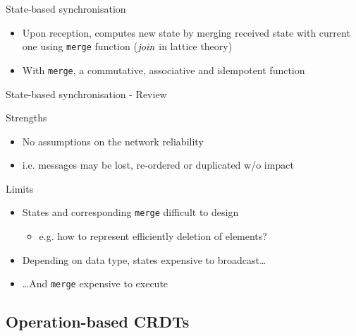 \begin{frame}{State-based synchronisation}
\begin{figure}[!ht]
{
        }
    \end{figure}

    \begin{itemize}
        \item<3-> Upon reception, \alert{computes new state by merging received state with current one} using \texttt{merge} function  ($\mathit{join}$ in lattice theory)
        \item<5-> With \texttt{merge}, a \alert{commutative, associative and idempotent function}
    \end{itemize}
\end{frame}

\begin{frame}{State-based synchronisation - Review}

    \begin{block}{Strengths}
        \begin{itemize}
            \item No assumptions on the network reliability
            \item i.e. messages may be lost, re-ordered or duplicated w/o impact
        \end{itemize}
    \end{block}
    \pause
    \begin{block}{Limits}
        \begin{itemize}
            \item States and corresponding \texttt{merge} difficult to design
            \begin{itemize}
                \item e.g. how to represent efficiently deletion of elements?
            \end{itemize}
            \pause
            \item Depending on data type, states expensive to broadcast\dots
            \item \dots And \texttt{merge} expensive to execute
        \end{itemize}
    \end{block}
\end{frame}

\subsection{Operation-based CRDTs}

